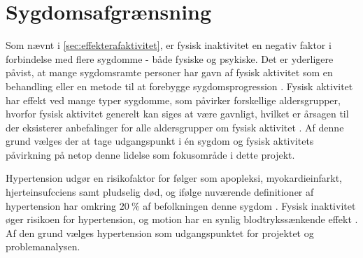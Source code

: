 \section{Sygdomsafgrænsning}
Som nævnt i \autoref{sec:effekterafaktivitet}, er fysisk inaktivitet en negativ faktor i forbindelse med flere sygdomme - både fysiske og psykiske. Det er yderligere påvist, at mange sygdomsramte personer har gavn af fysisk aktivitet som en behandling eller en metode til at forebygge sygdomsprogression \cite{motionsraad2007,pedersen2011}. Fysisk aktivitet har effekt ved mange typer sygdomme, som påvirker forskellige aldersgrupper, hvorfor fysisk aktivitet generelt kan siges at være gavnligt, hvilket er årsagen til der eksisterer anbefalinger for alle aldersgrupper om fysisk aktivitet \cite{pedersen2011}. Af denne grund vælges der at tage udgangspunkt i én sygdom og fysisk aktivitets påvirkning på netop denne lidelse som fokusområde i dette projekt.

Hypertension udgør en risikofaktor for følger som apopleksi, myokardieinfarkt, hjerteinsufcciens samt pludselig død, og ifølge nuværende definitioner af hypertension har omkring $20~\%$ af befolkningen denne sygdom \cite{pedersen2011}. Fysisk inaktivitet øger risikoen for hypertension, og motion har en synlig blodtrykssænkende effekt \cite{olsen2015}. Af den grund vælges hypertension som udgangspunktet for projektet og problemanalysen. 